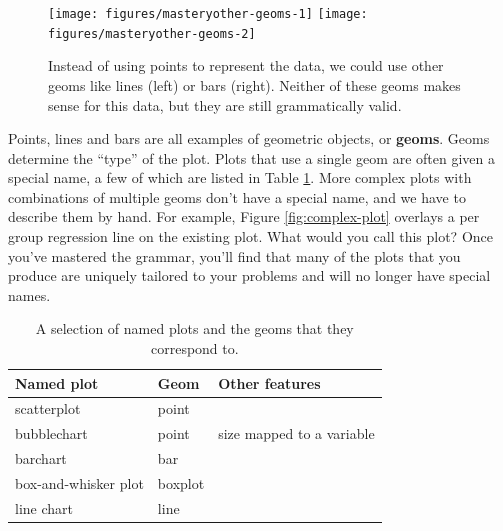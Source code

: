 \begin{figure}

{\centering \texttt{[image: figures/masteryother-geoms-1]} \texttt{[image: figures/masteryother-geoms-2]} 

}

\caption{Instead of using points to represent the data, we could use other geoms like lines (left) or bars (right).  Neither of these geoms makes sense for this data, but they are still grammatically valid.\label{fig:other-geoms}}
\end{figure}

Points, lines and bars are all examples of geometric objects, or
\textbf{geoms}. Geoms determine the ``type'' of the plot. Plots that use
a single geom are often given a special name, a few of which are listed
in Table \ref{tbl:named-plots}. More complex plots with combinations of
multiple geoms don't have a special name, and we have to describe them
by hand. For example, Figure \ref{fig:complex-plot} overlays a per group
regression line on the existing plot. What would you call this plot?
Once you've mastered the grammar, you'll find that many of the plots
that you produce are uniquely tailored to your problems and will no
longer have special names. 

\begin{table}[ht]
\centering
\begin{tabular}{lll}
  \hline
Named plot & Geom & Other features \\ 
  \hline
scatterplot & point &  \\ 
  bubblechart & point & size mapped to a variable \\ 
  barchart & bar &  \\ 
  box-and-whisker plot & boxplot &  \\ 
  line chart & line &  \\ 
   \hline
\end{tabular}
\caption{A selection of named plots and the geoms that they correspond to.} 
\label{tbl:named-plots}
\end{table}

\begin{Shaded}
\begin{Highlighting}[]
  \StringTok{ }
\StringTok{  }\NormalTok{(} \StringTok{ }\NormalTok{), } \NormalTok{)}
\end{Highlighting}
\end{Shaded}

